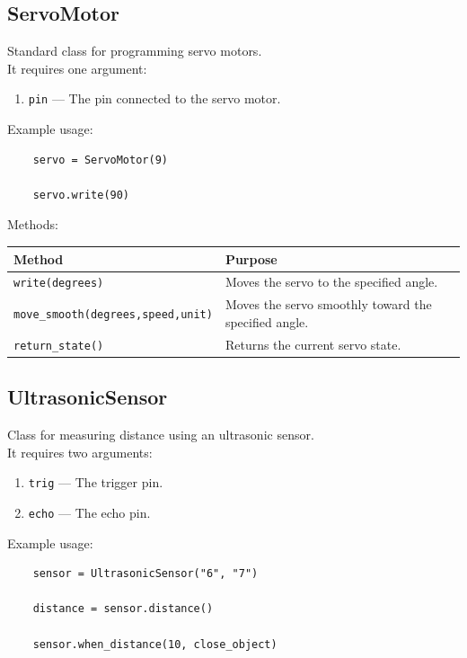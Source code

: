 \newpage
\subsection{ServoMotor}

Standard class for programming servo motors.\\
It requires one argument:

\begin{enumerate}
	\item \texttt{pin} --- The pin connected to the servo motor.
\end{enumerate}

Example usage:

\begin{lstlisting}
	servo = ServoMotor(9)
	
	servo.write(90)
\end{lstlisting}

Methods:

\begin{tabular}{ll}
	\toprule
	\textbf{Method} & \textbf{Purpose}\\
	\midrule
	\texttt{write(degrees)} & Moves the servo to the specified angle.\\
	\texttt{move\_smooth(degrees,speed,unit)} & Moves the servo smoothly toward the specified angle.\\
	\texttt{return\_state()} & Returns the current servo state.\\
	\bottomrule
\end{tabular}





\subsection{UltrasonicSensor}

Class for measuring distance using an ultrasonic sensor.\\
It requires two arguments:

\begin{enumerate}
	\item \texttt{trig} --- The trigger pin.
	\item \texttt{echo} --- The echo pin.
\end{enumerate}

Example usage:

\begin{lstlisting}
	sensor = UltrasonicSensor("6", "7")
	
	distance = sensor.distance()
	
	sensor.when_distance(10, close_object)
\end{lstlisting}


